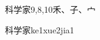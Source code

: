 \begin{entry}{科学家}{9,8,10}{⽲、⼦、⼧}
  \begin{phonetics}{科学家}{ke1xue2jia1}
  \end{phonetics}
\end{entry}
